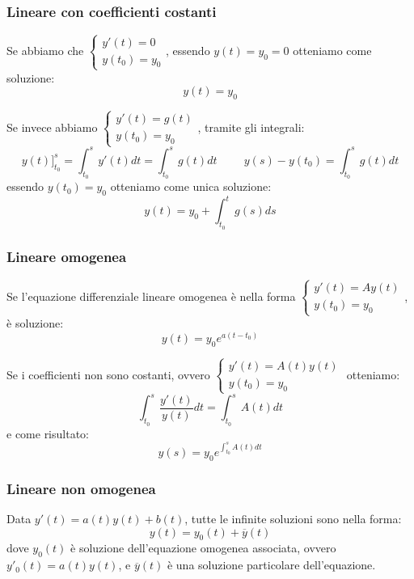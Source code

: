 \subsubsection{Lineare con coefficienti costanti}
Se abbiamo che $\begin{cases}y'(t)=0\\y(t_0)=y_0\end{cases}$, essendo $y(t)=y_0=0$ otteniamo come soluzione: \begin{equation*}
    y(t)=y_0
\end{equation*}

Se invece abbiamo $\begin{cases}y'(t)=g(t)\\y(t_0)=y_0\end{cases}$, tramite gli integrali:
\begin{equation*}y(t)]^s_{t_0}=\int^s_{t_0}y'(t)dt=\int^s_{t_0}g(t)dt\hspace{1cm}
                 y(s)-y(t_0)=\int^s_{t_0}g(t)dt\end{equation*}
essendo $y(t_0)=y_0$ otteniamo come unica soluzione:
\begin{equation*}y(t)=y_0+\int^t_{t_0}g(s)ds\end{equation*}

\subsubsection{Lineare omogenea}
Se l'equazione differenziale lineare omogenea è nella forma $\begin{cases}y'(t)=Ay(t)\\y(t_0)=y_0\end{cases}$, è soluzione:
\begin{equation*}y(t)=y_0e^{a(t-t_0)}\end{equation*}

Se i coefficienti non sono costanti, ovvero $\begin{cases}y'(t)=A(t)y(t)\\y(t_0)=y_0\end{cases}$ otteniamo:
\begin{equation*}\int^s_{t_0}\frac{y'(t)}{y(t)}dt=\int^s_{t_0}A(t)dt\end{equation*} e come risultato:
\begin{equation*}y(s)=y_0e^{\int^s_{t_0}A(t)dt}\end{equation*}

\subsubsection{Lineare non omogenea}
Data $y'(t)=a(t)y(t)+b(t)$, tutte le infinite soluzioni sono nella forma:
\begin{equation*}y(t)=y_0(t)+\overline{y}(t)\end{equation*}
dove $y_0(t)$ è soluzione dell'equazione omogenea associata, ovvero $y'_0(t)=a(t)y(t)$, e $\overline{y}(t)$ è una soluzione particolare dell'equazione.

